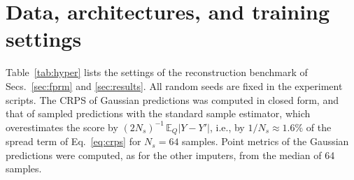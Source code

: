 \section{Data, architectures, and training settings}\label{app:hyper}

Table~\ref{tab:hyper} lists the settings of the reconstruction benchmark of Secs.~\ref{sec:fprm} and \ref{sec:results}. All random seeds are fixed in the experiment scripts. The CRPS of Gaussian predictions was computed in closed form, and that of sampled predictions with the standard sample estimator, which overestimates the score by $(2N_s)^{-1}\,\mathbb E_Q|Y-Y'|$, i.e., by $1/N_s\approx1.6\%$ of the spread term of Eq.~\eqref{eq:crps} for $N_s=64$ samples. Point metrics of the Gaussian predictions were computed, as for the other imputers, from the median of 64 samples.

